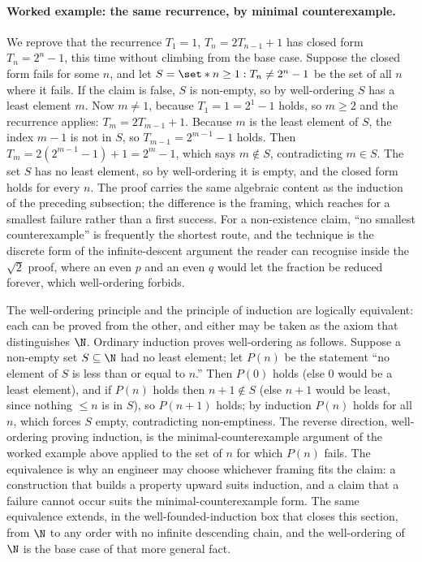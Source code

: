 \paragraph{Worked example: the same recurrence, by minimal
counterexample.} We reprove that the recurrence $T_{1} = 1$, $T_{n} = 2
T_{n-1} + 1$ has closed form $T_{n} = 2^{n} - 1$, this time without
climbing from the base case. Suppose the closed form fails for some $n$,
and let $S = \set*{n \geq 1 : T_{n} \neq 2^{n} - 1}$ be the set of all
$n$ where it fails. If the claim is false, $S$ is non-empty, so by
well-ordering $S$ has a least element $m$. Now $m \neq 1$, because $T_{1}
= 1 = 2^{1} - 1$ holds, so $m \geq 2$ and the recurrence applies:
$T_{m} = 2 T_{m-1} + 1$. Because $m$ is the least element of $S$, the
index $m - 1$ is not in $S$, so $T_{m-1} = 2^{m-1} - 1$ holds. Then
$T_{m} = 2(2^{m-1} - 1) + 1 = 2^{m} - 1$, which says $m \notin S$,
contradicting $m \in S$. The set $S$ has no least element, so by
well-ordering it is empty, and the closed form holds for every $n$. The
proof carries the same algebraic content as the induction of the
preceding subsection; the difference is the framing, which reaches for a
smallest failure rather than a first success. For a non-existence claim,
``no smallest counterexample'' is frequently the shortest route, and the
technique is the discrete form of the infinite-descent argument the
reader can recognise inside the $\sqrt 2$ proof, where an even $p$ and an
even $q$ would let the fraction be reduced forever, which well-ordering
forbids.

\begin{mastery}
The well-ordering principle and the principle of induction are
logically equivalent: each can be proved from the other, and either may
be taken as the axiom that distinguishes $\N$. Ordinary induction proves
well-ordering as follows. Suppose a non-empty set $S \subseteq \N$ had no
least element; let $P(n)$ be the statement ``no element of $S$ is less
than or equal to $n$.'' Then $P(0)$ holds (else $0$ would be a least
element), and if $P(n)$ holds then $n + 1 \notin S$ (else $n + 1$ would
be least, since nothing $\leq n$ is in $S$), so $P(n + 1)$ holds; by
induction $P(n)$ holds for all $n$, which forces $S$ empty, contradicting
non-emptiness. The reverse direction, well-ordering proving induction, is
the minimal-counterexample argument of the worked example above applied
to the set of $n$ for which $P(n)$ fails. The equivalence is why an
engineer may choose whichever framing fits the claim: a construction that
builds a property upward suits induction, and a claim that a failure
cannot occur suits the minimal-counterexample form. The same equivalence
extends, in the well-founded-induction box that closes this section, from
$\N$ to any order with no infinite descending chain, and the
well-ordering of $\N$ is the base case of that more general fact.
\end{mastery}

